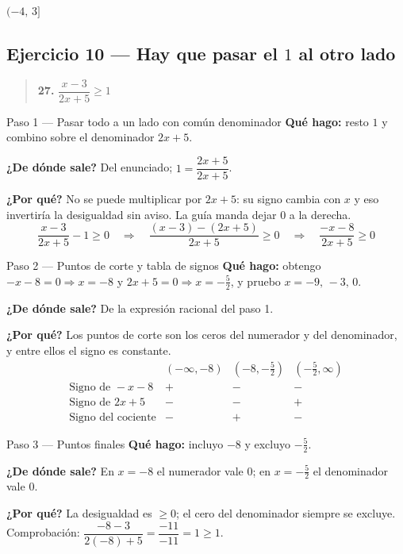 \documentclass[11pt]{article}
\begin{document}
\begin{resp}
$(-4,\,3]$
\end{resp}

\subsection*{Ejercicio 10 — Hay que pasar el $1$ al otro lado}

\begin{quote}
\textbf{27.} $\dfrac{x-3}{2x+5}\ge 1$
\end{quote}

\begin{paso}{Paso 1 --- Pasar todo a un lado con común denominador}
\textbf{Qué hago:} resto $1$ y combino sobre el denominador $2x+5$.

\textbf{¿De dónde sale?} Del enunciado; $1=\dfrac{2x+5}{2x+5}$.

\textbf{¿Por qué?} No se puede multiplicar por $2x+5$: su signo cambia con $x$ y eso invertiría la desigualdad sin aviso. La guía manda dejar $0$ a la derecha.
\[
\frac{x-3}{2x+5}-1\ge 0
\quad\Longrightarrow\quad
\frac{(x-3)-(2x+5)}{2x+5}\ge 0
\quad\Longrightarrow\quad
\frac{-x-8}{2x+5}\ge 0
\]
\end{paso}

\begin{paso}{Paso 2 --- Puntos de corte y tabla de signos}
\textbf{Qué hago:} obtengo $-x-8=0\Rightarrow x=-8$ y $2x+5=0\Rightarrow x=-\frac52$, y pruebo $x=-9,\,-3,\,0$.

\textbf{¿De dónde sale?} De la expresión racional del paso 1.

\textbf{¿Por qué?} Los puntos de corte son los ceros del numerador y del denominador, y entre ellos el signo es constante.
\[
\begin{array}{l|ccc}
 & (-\infty,-8) & (-8,-\tfrac52) & (-\tfrac52,\infty)\\\hline
\text{Signo de } -x-8 & + & - & -\\
\text{Signo de } 2x+5 & - & - & +\\\hline
\text{Signo del cociente} & - & + & -
\end{array}
\]
\end{paso}

\begin{paso}{Paso 3 --- Puntos finales}
\textbf{Qué hago:} incluyo $-8$ y excluyo $-\frac52$.

\textbf{¿De dónde sale?} En $x=-8$ el numerador vale $0$; en $x=-\frac52$ el denominador vale $0$.

\textbf{¿Por qué?} La desigualdad es $\ge 0$; el cero del denominador siempre se excluye. Comprobación: $\dfrac{-8-3}{2(-8)+5}=\dfrac{-11}{-11}=1\ge 1$.
\end{paso}
\end{document}
